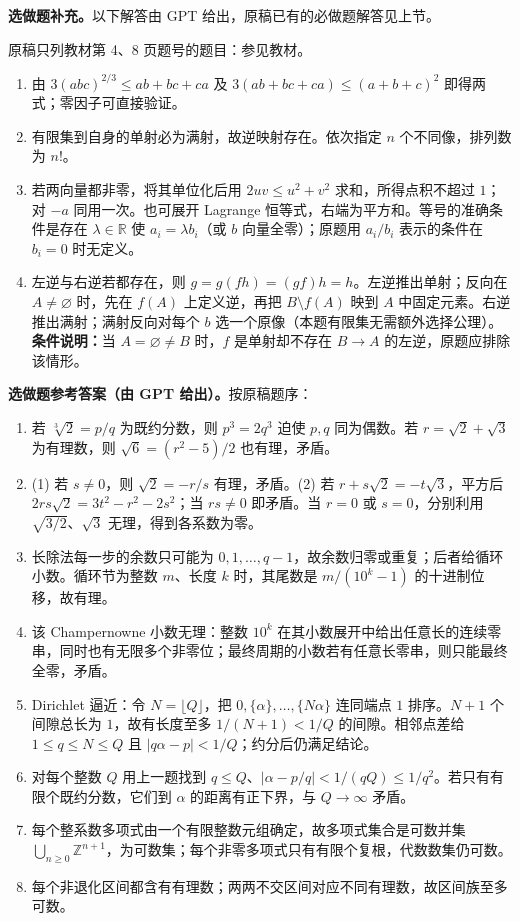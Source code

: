 \noindent\textbf{选做题补充。}以下解答由 GPT 给出，原稿已有的必做题解答见上节。
\par\noindent 原稿只列教材第 4、8 页题号的题目：参见教材。
\begin{enumerate}
\item 由 $3(abc)^{2/3}\le ab+bc+ca$ 及 $3(ab+bc+ca)\le(a+b+c)^2$ 即得两式；零因子可直接验证。
\item 有限集到自身的单射必为满射，故逆映射存在。依次指定 $n$ 个不同像，排列数为 $n!$。
\item 若两向量都非零，将其单位化后用 $2uv\le u^2+v^2$ 求和，所得点积不超过 $1$；对 $-a$ 同用一次。也可展开 Lagrange 恒等式，右端为平方和。等号的准确条件是存在 $\lambda\in\mathbb R$ 使 $a_i=\lambda b_i$（或 $b$ 向量全零）；原题用 $a_i/b_i$ 表示的条件在 $b_i=0$ 时无定义。
\item 左逆与右逆若都存在，则 $g=g(fh)=(gf)h=h$。左逆推出单射；反向在 $A\ne\varnothing$ 时，先在 $f(A)$ 上定义逆，再把 $B\setminus f(A)$ 映到 $A$ 中固定元素。右逆推出满射；满射反向对每个 $b$ 选一个原像（本题有限集无需额外选择公理）。\textbf{条件说明：}当 $A=\varnothing\ne B$ 时，$f$ 是单射却不存在 $B\to A$ 的左逆，原题应排除该情形。
\end{enumerate}
\noindent\textbf{选做题参考答案（由 GPT 给出）。}按原稿题序：
\begin{enumerate}
\item 若 $\sqrt[3]2=p/q$ 为既约分数，则 $p^3=2q^3$ 迫使 $p,q$ 同为偶数。若 $r=\sqrt2+\sqrt3$ 为有理数，则 $\sqrt6=(r^2-5)/2$ 也有理，矛盾。
\item (1) 若 $s\ne0$，则 $\sqrt2=-r/s$ 有理，矛盾。(2) 若 $r+s\sqrt2=-t\sqrt3$，平方后 $2rs\sqrt2=3t^2-r^2-2s^2$；当 $rs\ne0$ 即矛盾。当 $r=0$ 或 $s=0$，分别利用 $\sqrt{3/2}$、$\sqrt3$ 无理，得到各系数为零。
\item 长除法每一步的余数只可能为 $0,1,\ldots,q-1$，故余数归零或重复；后者给循环小数。循环节为整数 $m$、长度 $k$ 时，其尾数是 $m/(10^k-1)$ 的十进制位移，故有理。
\item 该 Champernowne 小数无理：整数 $10^k$ 在其小数展开中给出任意长的连续零串，同时也有无限多个非零位；最终周期的小数若有任意长零串，则只能最终全零，矛盾。
\item Dirichlet 逼近：令 $N=\lfloor Q\rfloor$，把 $0,\{\alpha\},\ldots,\{N\alpha\}$ 连同端点 $1$ 排序。$N+1$ 个间隙总长为 $1$，故有长度至多 $1/(N+1)<1/Q$ 的间隙。相邻点差给 $1\le q\le N\le Q$ 且 $|q\alpha-p|<1/Q$；约分后仍满足结论。
\item 对每个整数 $Q$ 用上一题找到 $q\le Q$、$|\alpha-p/q|<1/(qQ)\le1/q^2$。若只有有限个既约分数，它们到 $\alpha$ 的距离有正下界，与 $Q\to\infty$ 矛盾。
\item 每个整系数多项式由一个有限整数元组确定，故多项式集合是可数并集 $\bigcup_{n\ge0}\mathbb Z^{n+1}$，为可数集；每个非零多项式只有有限个复根，代数数集仍可数。
\item 每个非退化区间都含有有理数；两两不交区间对应不同有理数，故区间族至多可数。
\end{enumerate}
